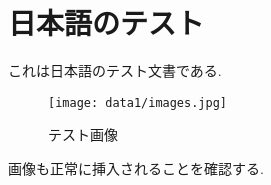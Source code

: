 \documentclass[a4paper]{article}
\begin{document}
\section*{日本語のテスト}
これは日本語のテスト文書である.

\begin{figure}[ht]
    \centering
    \texttt{[image: data1/images.jpg]}
    \caption{テスト画像}
    \label{fig:sample_image}
\end{figure}

画像も正常に挿入されることを確認する.
\end{document}
